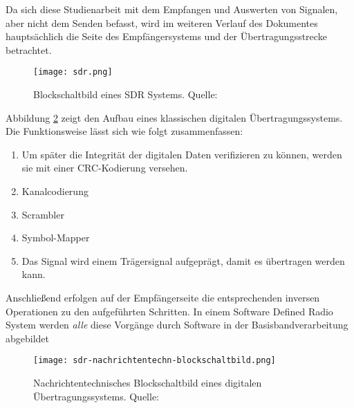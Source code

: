 Da sich diese Studienarbeit mit dem Empfangen und Auswerten von Signalen, aber nicht dem Senden befasst, wird im weiteren Verlauf des Dokumentes hauptsächlich die Seite des Empfängersystems und der Übertragungsstrecke betrachtet.

\begin{figure}[ht]
	\centering
	\texttt{[image: sdr.png]}
	\caption[Blockschaltbild eines SDR Systems]{Blockschaltbild eines SDR Systems. Quelle: \cite[Heuberger, e. a., S. 37]{Heuberger:2017}}
	\label{sdr-blockschaltbild}
\end{figure}

Abbildung \ref{nachrichtentechn-blockschaltbild} zeigt den Aufbau eines klassischen digitalen Übertragungssystems. Die Funktionsweise lässt sich wie folgt zusammenfassen:
\begin{enumerate} %
	\item Um später die Integrität der digitalen Daten verifizieren zu können, werden sie mit einer \ac{CRC}-Kodierung versehen.
	\item Kanalcodierung %
	\item Scrambler %
	\item Symbol-Mapper %
	\item Das Signal wird einem Trägersignal aufgeprägt, damit es übertragen werden kann.
\end{enumerate}

Anschließend erfolgen auf der Empfängerseite die entsprechenden inversen Operationen zu den aufgeführten Schritten. In einem Software Defined Radio System werden \textit{alle} diese Vorgänge durch Software in der Basisbandverarbeitung abgebildet \cite[vgl. Heuberger, e. a., S. 38]{Heuberger:2017}

\begin{figure}[ht]
	\centering
	\texttt{[image: sdr-nachrichtentechn-blockschaltbild.png]}
	\caption[Nachrichtentechnisches Blockschaltbild eines digitalen Übertragungssystems]{Nachrichtentechnisches Blockschaltbild eines digitalen Übertragungssystems. Quelle: \cite[Heuberger, e. a., S. 38]{Heuberger:2017}}
	\label{nachrichtentechn-blockschaltbild}
\end{figure}






